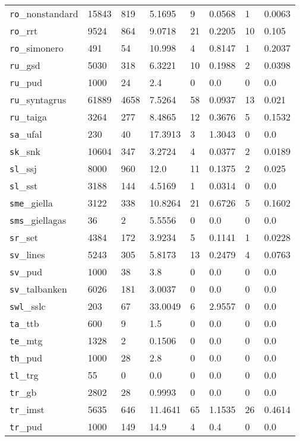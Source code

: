 \begin{longtable}{|l|l|l|l|l|l|l|l|}
\texttt{ro}\_nonstandard & 15843 & 819 & 5.1695 & 9 & 0.0568 & 1 & 0.0063\\
\texttt{ro}\_rrt & 9524 & 864 & 9.0718 & 21 & 0.2205 & 10 & 0.105\\
\texttt{ro}\_simonero & 491 & 54 & 10.998 & 4 & 0.8147 & 1 & 0.2037\\
\texttt{ru}\_gsd & 5030 & 318 & 6.3221 & 10 & 0.1988 & 2 & 0.0398\\
\texttt{ru}\_pud & 1000 & 24 & 2.4 & 0 & 0.0 & 0 & 0.0\\
\texttt{ru}\_syntagrus & 61889 & 4658 & 7.5264 & 58 & 0.0937 & 13 & 0.021\\
\texttt{ru}\_taiga & 3264 & 277 & 8.4865 & 12 & 0.3676 & 5 & 0.1532\\
\texttt{sa}\_ufal & 230 & 40 & 17.3913 & 3 & 1.3043 & 0 & 0.0\\
\texttt{sk}\_snk & 10604 & 347 & 3.2724 & 4 & 0.0377 & 2 & 0.0189\\
\texttt{sl}\_ssj & 8000 & 960 & 12.0 & 11 & 0.1375 & 2 & 0.025\\
\texttt{sl}\_sst & 3188 & 144 & 4.5169 & 1 & 0.0314 & 0 & 0.0\\
\texttt{sme}\_giella & 3122 & 338 & 10.8264 & 21 & 0.6726 & 5 & 0.1602\\
\texttt{sms}\_giellagas & 36 & 2 & 5.5556 & 0 & 0.0 & 0 & 0.0\\
\texttt{sr}\_set & 4384 & 172 & 3.9234 & 5 & 0.1141 & 1 & 0.0228\\
\texttt{sv}\_lines & 5243 & 305 & 5.8173 & 13 & 0.2479 & 4 & 0.0763\\
\texttt{sv}\_pud & 1000 & 38 & 3.8 & 0 & 0.0 & 0 & 0.0\\
\texttt{sv}\_talbanken & 6026 & 181 & 3.0037 & 0 & 0.0 & 0 & 0.0\\
\texttt{swl}\_sslc & 203 & 67 & 33.0049 & 6 & 2.9557 & 0 & 0.0\\
\texttt{ta}\_ttb & 600 & 9 & 1.5 & 0 & 0.0 & 0 & 0.0\\
\texttt{te}\_mtg & 1328 & 2 & 0.1506 & 0 & 0.0 & 0 & 0.0\\
\texttt{th}\_pud & 1000 & 28 & 2.8 & 0 & 0.0 & 0 & 0.0\\
\texttt{tl}\_trg & 55 & 0 & 0.0 & 0 & 0.0 & 0 & 0.0\\
\texttt{tr}\_gb & 2802 & 28 & 0.9993 & 0 & 0.0 & 0 & 0.0\\
\texttt{tr}\_imst & 5635 & 646 & 11.4641 & 65 & 1.1535 & 26 & 0.4614\\
\texttt{tr}\_pud & 1000 & 149 & 14.9 & 4 & 0.4 & 0 & 0.0\\

\end{longtable}
